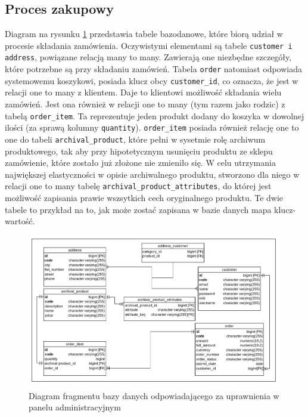 \subsection{Proces zakupowy}
Diagram na rysunku \ref{db_zakup} przedstawia tabele bazodanowe, które biorą udział w procesie składania zamówienia. Oczywistymi elementami są tabele \texttt{customer i address}, powiązane relacją many to many. Zawierają one niezbędne szczegóły, które potrzebne są przy składaniu zamówień. Tabela \texttt{order} natomiast odpowiada systemowemu koszykowi, posiada klucz obcy \texttt{customer\_id}, co oznacza, że jest w relacji one to many z klientem. Daje to klientowi możliwość składania wielu zamówień. Jest ona również w relacji one to many (tym razem jako rodzic) z tabelą \texttt{order\_item}.  Ta reprezentuje jeden produkt dodany do koszyka w dowolnej ilości (za sprawą kolumny \texttt{quantity}). \texttt{order\_item} posiada również relację one to one do tabeli \texttt{archival\_product}, które pełni w sysetmie rolę archiwum produktowego, tak aby przy hipotetycznym usunięciu produktu ze sklepu zamówienie, które zostało już złożone nie zmieniło się. W celu utrzymania największej elastyczności w opisie archiwalnego produktu, stworzono dla niego w relacji one to many tabelę \texttt{archival\_product\_attributes}, do której jest możliwość zapisania prawie wszsytkich cech oryginalnego produktu. Te dwie tabele to przykład na to, jak może zostać zapisana w bazie danych mapa klucz-wartość.  

\begin{figure}
	\begin{center}
		\includegraphics[scale=0.28]{db_zakup.png}
	\end{center}
	\caption{{\color{black}Diagram fragmentu bazy danych odpowiadającego za uprawnienia w panelu administracyjnym}} \label{db_zakup}
\end{figure}

